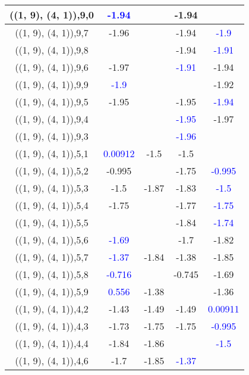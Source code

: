 \documentclass{article}
\begin{document}
\begin{center}
\begin{longtable}{|c|c|c|c|c|}
        	\hline
        	((1, 9), (4, 1)),9,0& \textcolor{blue}{-1.94}&&-1.94&\\
        	\hline
        	((1, 9), (4, 1)),9,7&-1.96&&-1.94& \textcolor{blue}{-1.9}\\
        	\hline
        	((1, 9), (4, 1)),9,8&&&-1.94& \textcolor{blue}{-1.91}\\
        	\hline
        	((1, 9), (4, 1)),9,6&-1.97&& \textcolor{blue}{-1.91}&-1.94\\
        	\hline
        	((1, 9), (4, 1)),9,9& \textcolor{blue}{-1.9}&&&-1.92\\
        	\hline
        	((1, 9), (4, 1)),9,5&-1.95&&-1.95& \textcolor{blue}{-1.94}\\
        	\hline
        	((1, 9), (4, 1)),9,4&&& \textcolor{blue}{-1.95}&-1.97\\
        	\hline
        	((1, 9), (4, 1)),9,3&&& \textcolor{blue}{-1.96}&\\
        	\hline
        	((1, 9), (4, 1)),5,1& \textcolor{blue}{0.00912}&-1.5&-1.5&\\
        	\hline
        	((1, 9), (4, 1)),5,2&-0.995&&-1.75& \textcolor{blue}{-0.995}\\
        	\hline
        	((1, 9), (4, 1)),5,3&-1.5&-1.87&-1.83& \textcolor{blue}{-1.5}\\
        	\hline
        	((1, 9), (4, 1)),5,4&-1.75&&-1.77& \textcolor{blue}{-1.75}\\
        	\hline
        	((1, 9), (4, 1)),5,5&&&-1.84& \textcolor{blue}{-1.74}\\
        	\hline
        	((1, 9), (4, 1)),5,6& \textcolor{blue}{-1.69}&&-1.7&-1.82\\
        	\hline
        	((1, 9), (4, 1)),5,7& \textcolor{blue}{-1.37}&-1.84&-1.38&-1.85\\
        	\hline
        	((1, 9), (4, 1)),5,8& \textcolor{blue}{-0.716}&&-0.745&-1.69\\
        	\hline
        	((1, 9), (4, 1)),5,9& \textcolor{blue}{0.556}&-1.38&&-1.36\\
        	\hline
        	((1, 9), (4, 1)),4,2&-1.43&-1.49&-1.49& \textcolor{blue}{0.00911}\\
        	\hline
        	((1, 9), (4, 1)),4,3&-1.73&-1.75&-1.75& \textcolor{blue}{-0.995}\\
        	\hline
        	((1, 9), (4, 1)),4,4&-1.84&-1.86&& \textcolor{blue}{-1.5}\\
        	\hline
        	((1, 9), (4, 1)),4,6&-1.7&-1.85& \textcolor{blue}{-1.37}&\\

\end{longtable}
\end{center}
\end{document}
